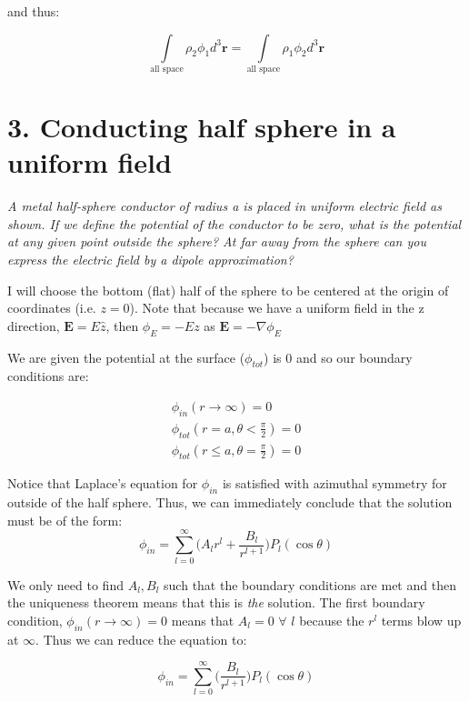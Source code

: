\documentclass[a4paper, 11pt]{article}
\begin{document}
and thus: 

\begin{equation}
	\int\limits_{\mbox{all space}} \rho_2 \phi_1 d^3\mathbf{r} = \int\limits_{\mbox{all space}} \rho_1 \phi_2 d^3\mathbf{r} 
\end{equation}

\section*{3. Conducting half sphere in a uniform field}
\textit{A metal half-sphere conductor of radius a is placed in uniform electric field as shown. If we define the potential of the conductor to be zero, what is the potential at any given point outside the sphere? At far away from the sphere can you express the electric field by a dipole approximation?}

I will choose the bottom (flat) half of the sphere to be centered at the origin of coordinates (i.e. $z = 0$). Note that because we have a uniform field in the z direction, $\mathbf{E} = E \hat{z}$, then $\phi_E = -Ez$ as $\mathbf{E} = -\nabla \phi_E$

We are given the potential at the surface ($\phi_{tot}$) is 0 and so our boundary conditions are: 

\begin{align}
	\phi_{in}(r \rightarrow \infty) = 0 \\ 
	\phi_{tot}(r=a, \theta < \frac{\pi}{2}) = 0 \\ 
	\phi_{tot}(r\leq a , \theta = \frac{\pi}{2}) = 0 
\end{align}

Notice that Laplace's equation for $\phi_{in}$ is satisfied with azimuthal symmetry for outside of the half sphere. Thus, we can immediately conclude that the solution must be of the form: 
\begin{equation*}
	\phi_{in} = \sum\limits_{l = 0}^{\infty} \bigg( A_lr^l + \frac{B_l}{r^{l+1}} \bigg)P_l (\cos{\theta})
\end{equation*}

We only need to find $A_l, B_l$ such that the boundary conditions are met and then the uniqueness theorem means that this is \textit{the} solution. The first boundary condition, $\phi_{in}(r\rightarrow \infty) = 0$ means that $A_l = 0$  $\forall$ $l$ because the $r^l$ terms blow up at $\infty$. Thus we can reduce the equation to: 

\begin{equation*}
	\phi_{in} = \sum\limits_{l = 0}^{\infty} \bigg( \frac{B_l}{r^{l+1}} \bigg)P_l(\cos{\theta})
\end{equation*}
\end{document}
